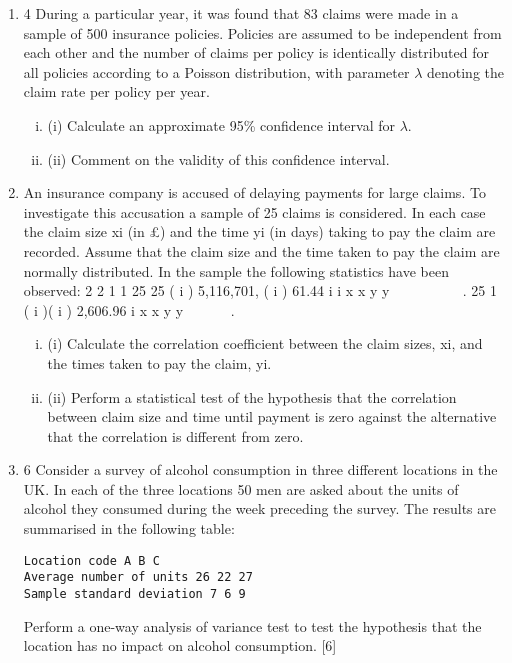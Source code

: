\documentclass[a4paper,12pt]{article}
\begin{document}
\begin{enumerate}


  
\item 4 During a particular year, it was found that 83 claims were made in a sample of 500 insurance policies. Policies are assumed to be independent from each other and the number of claims per policy is identically distributed for all policies according to a Poisson distribution, with parameter $\lambda$ denoting the claim rate per policy per year.
\begin{enumerate}[(i)]
\item (i) Calculate an approximate 95\% confidence interval for $\lambda$. 
\item (ii) Comment on the validity of this confidence interval. 
\end{enumerate}
 \item  
An insurance company is accused of delaying payments for large claims. To investigate this accusation a sample of 25 claims is considered. In each case the claim size xi (in £) and the time yi (in days) taking to pay the claim are recorded.
Assume that the claim size and the time taken to pay the claim are normally distributed. In the sample the following statistics have been observed:
  2 2
1 1
25 25
( i ) 5,116,701, ( i ) 61.44
i i
x x y y
 
      .
25
1
( i )( i ) 2,606.96
i
x x y y

    .
\begin{enumerate}[(i)]
\item (i) Calculate the correlation coefficient between the claim sizes, xi, and the times taken to pay the claim, yi.
\item (ii) Perform a statistical test of the hypothesis that the correlation between claim size and time until payment is zero against the alternative that the correlation is different from zero. 
\end{enumerate}

\item 6 Consider a survey of alcohol consumption in three different locations in the UK. In
each of the three locations 50 men are asked about the units of alcohol they
consumed during the week preceding the survey. The results are summarised in the
following table:

\begin{verbatim}
Location code A B C
Average number of units 26 22 27
Sample standard deviation 7 6 9
\end{verbatim}
Perform a one-way analysis of variance test to test the hypothesis that the location has no impact on alcohol consumption. [6]
\end{enumerate}
\newpage
\end{document}
